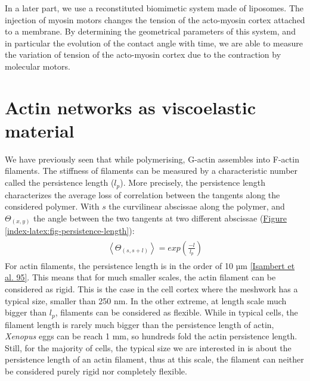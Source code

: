 \documentclass[A4paperpaper,11pt,english]{sphinxmanual}
\begin{document}
In a later part, we use a reconstituted biomimetic system made of liposomes. The
injection of myosin motors changes the tension of the acto-myosin cortex
attached to a membrane. By determining the geometrical parameters of this
system, and in particular the evolution of the contact angle with time, we are
able to measure the variation of tension of the acto-myosin cortex due to the contraction by
molecular motors.


\section{Actin networks as viscoelastic material}
\label{index-latex:actin-networks-as-viscoelastic-material}\label{index-latex:viscoelastic}
We have previously seen that while polymerising, G-actin assembles into F-actin
filaments. The stiffness of filaments can be measured by a characteristic number
called the persistence length (\(l_p\)). More precisely, the
persistence length characterizes the average loss of correlation between the
tangents along the considered polymer. With \(s\) the curvilinear abscissae along the polymer,
and \(\Theta_{(x,y)}\) the angle between the two tangents at two different abscissae (\hyperref[index-latex:fig-persistence-length]{Figure  \ref*{index-latex:fig-persistence-length}}):
\label{index-latex:equation-eqa6}\begin{gather}
\begin{split}\left<\Theta_{(s,s+l)}\right> = exp\left(\frac{-l}{l_p}\right)\end{split}\label{index-latex-eqa6}
\end{gather}
For actin filaments, the
persistence length is in the order of 10 µm {\hyperref[index-latex:isambert1995]{{[}Isambert et al. 95{]}}}. This means
that for much smaller scales, the actin filament can be considered as rigid.
This is the case in the cell cortex where the meshwork has a typical size, smaller than 250 nm. In
the other extreme, at length scale much bigger than \(l_p\), filaments can
be considered as flexible. While in typical cells, the filament length is
rarely much bigger than the persistence length of actin, \emph{Xenopus} eggs can be
reach 1 mm, so hundreds fold the actin persistence length.
Still, for the majority of cells, the typical size we are interested in
is about the persistence length of an actin filament, thus at this scale, the filament can neither be considered purely
rigid nor completely flexible.
\end{document}
